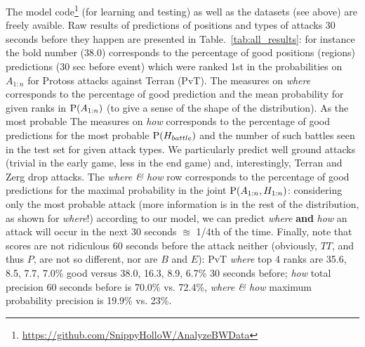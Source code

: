 The model code\footnote{\url{https://github.com/SnippyHolloW/AnalyzeBWData}} (for learning and testing) as well as the datasets (see above) are freely avaible. Raw results of predictions of positions and types of attacks 30 seconds before they happen are presented in Table.~\ref{tab:all_results}: for instance the bold number (38.0) corresponds to the percentage of good positions (regions) predictions (30 sec before event) which were ranked 1st in the probabilities on $A_{1:n}$ for Protoss attacks against Terran (PvT). The measures on \textit{where} corresponds to the percentage of good prediction and the mean probability for given ranks in $\mathrm{P}(A_{1:n})$ (to give a sense of the shape of the distribution). As the most probable The measures on \textit{how} corresponds to the percentage of good predictions for the most probable $\mathrm{P}(H_{battle})$ and the number of such battles seen in the test set for given attack types. We particularly predict well ground attacks (trivial in the early game, less in the end game) and, interestingly, Terran and Zerg drop attacks. The \textit{where \& how} row corresponds to the percentage of good predictions for the maximal probability in the joint $\mathrm{P}(A_{1:n},H_{1:n})$: considering only the most probable attack (more information is in the rest of the distribution, as shown for \textit{where}!) according to our model, we can predict \textit{where} \textbf{and} \textit{how} an attack will occur in the next 30 seconds $\approxeq$ 1/4th of the time. Finally, note that scores are not ridiculous 60 seconds before the attack neither (obviously, $TT$, and thus $P$, are not so different, nor are $B$ and $E$): PvT \textit{where} top 4 ranks are 35.6, 8.5, 7.7, 7.0\% good versus 38.0, 16.3, 8.9, 6.7\% 30 seconds before; \textit{how} total precision 60 seconds before is 70.0\% vs. 72.4\%, \textit{where \& how} maximum probability precision is 19.9\% vs. 23\%.

